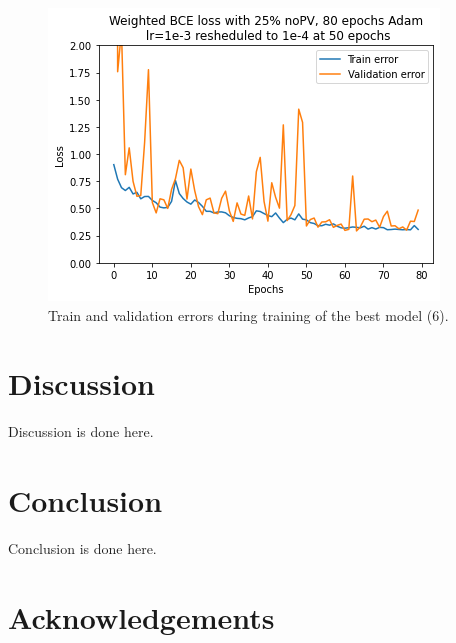 \documentclass[10pt,conference]{IEEEtran}
\begin{document}
\begin{figure}[tbp]
    \centering
    \includegraphics[width=\columnwidth]{report/images/train_validation_errors.png}
    \caption{Train and validation errors during training of the best model (6).}
    \label{fig:train_validation_errors}
\end{figure}

\section{Discussion}
Discussion is done here.

\section{Conclusion}
Conclusion is done here.

\section*{Acknowledgements}



\end{document}
